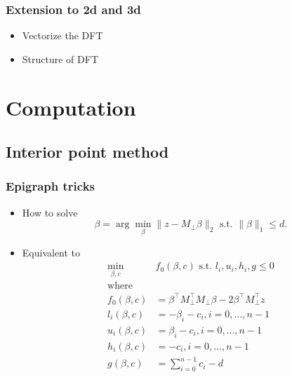\documentclass{beamer}
\begin{document}
\begin{frame}
    \frametitle{Extension to 2d and 3d}
\begin{itemize}
    \item Vectorize the DFT
    \item Structure of DFT
\end{itemize}
\end{frame}

\section{Computation}
\subsection{Interior point method}
\begin{frame}
\frametitle{Epigraph tricks}
\begin{itemize}
\item How to solve
\begin{equation}\label{realopt}
    \beta = \arg\min_{\beta}\|z-M_{\perp}\beta\|_2\text{ s.t. }\|\beta\|_1\leq d.
\end{equation}
\item Equivalent to
\begin{equation}\label{func_val}
    \begin{aligned}
    \min_{\beta,c} \quad& f_0(\beta, c) \text{ s.t. } l_i,u_i,h_i,g\leq 0\\
    \text{where}\\
        f_0(\beta, c) &= \beta^\top M_{\perp}^\top M_{\perp}\beta-2\beta^\top M_{\perp}^\top z \\
    l_i(\beta, c) &= -\beta_i-c_i, i = 0,\dots, n-1\\
    u_i(\beta, c) &= \beta_i - c_i, i = 0, \dots, n-1\\    
    h_i(\beta, c) &= -c_i, i = 0, \dots, n-1\\
    g(\beta, c) &= \sum_{i=0}^{n-1} c_i - d
    \end{aligned}
\end{equation}
\end{itemize}
\end{frame}
\end{document}
